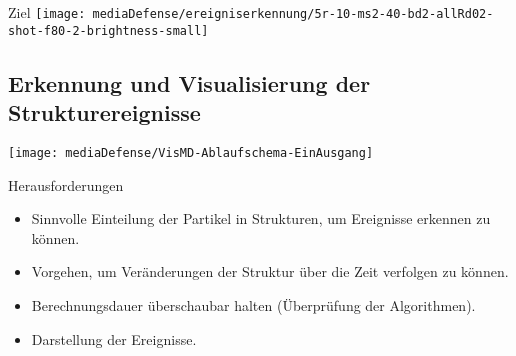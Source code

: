 \documentclass[10pt]{beamer}
\begin{document}
%
%
\begin{frame}{Ziel}
	\texttt{[image: mediaDefense/ereigniserkennung/5r-10-ms2-40-bd2-allRd02-shot-f80-2-brightness-small]}
\end{frame}

\subsection{Erkennung und Visualisierung der Strukturereignisse}

%
%
\begin{wideframe}
	\texttt{[image: mediaDefense/VisMD-Ablaufschema-EinAusgang]}
\end{wideframe}

%
%
\begin{frame}{Herausforderungen}
	\begin{itemize}
		\item Sinnvolle Einteilung der Partikel in Strukturen, um Ereignisse erkennen zu können.
		\item Vorgehen, um Veränderungen der Struktur über die Zeit verfolgen zu können.
		\item Berechnungsdauer überschaubar halten (Überprüfung der Algorithmen).
		\item Darstellung der Ereignisse.
	\end{itemize}
\end{frame}
\end{document}
